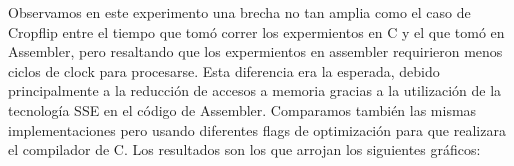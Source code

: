 \documentclass[a4paper]{article}
\begin{document}
\begin{centering}
\end{centering}

Observamos en este experimento una brecha no tan amplia como el caso de Cropflip
entre el tiempo que tomó correr los expermientos en C y el que tomó en Assembler, pero resaltando
que los expermientos en assembler requirieron menos ciclos de clock para procesarse.
Esta diferencia era la esperada, debido principalmente a la reducción de accesos a
memoria gracias a la utilización de la tecnología SSE en el código de Assembler. Comparamos también las
mismas implementaciones pero usando diferentes flags de optimización para que
realizara el compilador de C. Los resultados son los que arrojan los siguientes gráficos:

\end{document}
